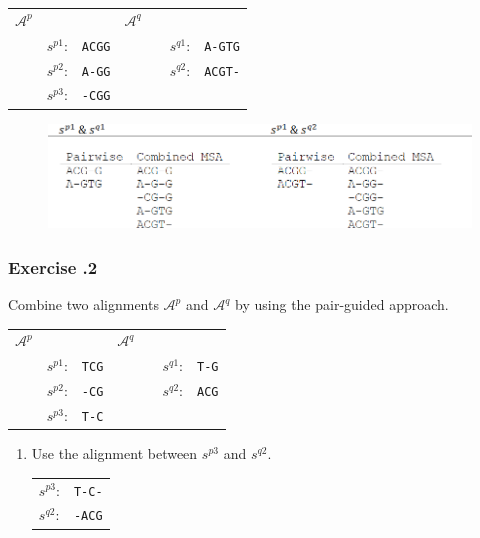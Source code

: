 \begin{table}[H]
\centering
\begin{tabular}{lllllll}
$\mathcal{A}^{p}$ & & \hspace{10em} & $\mathcal{A}^{q}$  & &  \\
 & $s^{p1}$: & \verb|ACGG| &  &  & $s^{q1}$: & \verb|A-GTG| \\
                        & $s^{p2}$: & \verb|A-GG| &      &                         & $s^{q2}$: & \verb|ACGT-| \\
                        & $s^{p3}$: &  \verb|-CGG| &      &                         &  & 
\end{tabular}
\end{table}

\begin{figure}[H]
  \centering
      \includegraphics[width=0.9 \textwidth]{fig10/pair_guided_progress_alignment.png}
\end{figure}

%
%
\newpage

%
%
\subsubsection*{Exercise \thesection.2}
Combine two alignments $\mathcal{A}^p$ and $\mathcal{A}^q$ by using the pair-guided approach.

\begin{table}[H]
\centering
\begin{tabular}{lllllll}
$\mathcal{A}^{p}$ & & \hspace{10em} & $\mathcal{A}^{q}$  & &  \\
 & $s^{p1}$: & \verb|TCG| &  &  & $s^{q1}$: & \verb|T-G| \\
                        & $s^{p2}$: & \verb|-CG| &      &                         & $s^{q2}$: & \verb|ACG| \\
                        & $s^{p3}$: &  \verb|T-C| &      &                         &  & 
\end{tabular}
\end{table}

\begin{enumerate}
\item Use the alignment between $s^{p3}$ and $s^{q2}$.

\begin{table}[H]
\centering
\begin{tabular}{ll}
 $s^{p3}$:& \verb|T-C-| \\
 $s^{q2}$:& \verb|-ACG|
\end{tabular}
\end{table}

\end{enumerate}
\bigskip 

%
